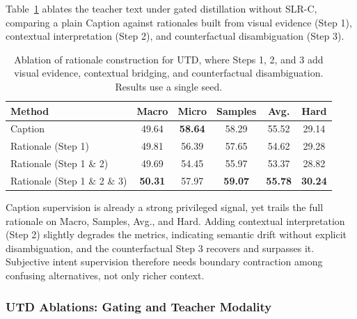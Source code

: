 Table~\ref{tab:rationale_ablation} ablates the teacher text under gated distillation without SLR-C, comparing a plain Caption against rationales built from visual evidence (Step 1), contextual interpretation (Step 2), and counterfactual disambiguation (Step 3).
\begin{table}[htbp]
\centering
\caption{Ablation of rationale construction for UTD, where Steps 1, 2, and 3 add visual evidence, contextual bridging, and counterfactual disambiguation. Results use a single seed.}
\label{tab:rationale_ablation}
\begin{tabular}{lccccc}
\hline
Method & Macro & Micro & Samples & Avg. & Hard \\
\hline
Caption & 49.64 & \textbf{58.64} & 58.29 & 55.52 & 29.14 \\
Rationale (Step 1) & 49.81 & 56.39 & 57.65 & 54.62 & 29.28 \\
Rationale (Step 1 \& 2) & 49.69 & 54.45 & 55.97 & 53.37 & 28.82 \\
Rationale (Step 1 \& 2 \& 3) & \textbf{50.31} & 57.97 & \textbf{59.07} & \textbf{55.78} & \textbf{30.24} \\
\hline
\end{tabular}
\end{table}

Caption supervision is already a strong privileged signal, yet trails the full rationale on Macro, Samples, Avg., and Hard. Adding contextual interpretation (Step 2) slightly degrades the metrics, indicating semantic drift without explicit disambiguation, and the counterfactual Step 3 recovers and surpasses it. Subjective intent supervision therefore needs boundary contraction among confusing alternatives, not only richer context.

\iffalse
\subsubsection{UTD Ablations: Gating and Teacher Modality}

